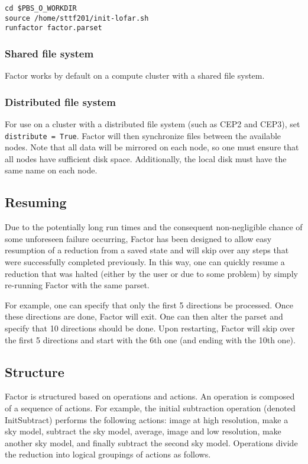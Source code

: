 \documentclass[structabstract]{article}
\begin{document}
{\begin{verbatim}
cd $PBS_O_WORKDIR
source /home/sttf201/init-lofar.sh
runfactor factor.parset
\end{verbatim}

\subsubsection{Shared file system}
Factor works by default on a compute cluster with a shared file system.

\subsubsection{Distributed file system}
For use on a cluster with a distributed file system (such as CEP2 and CEP3), set
{\tt distribute = True}. Factor will then synchronize files between the
available nodes. Note that all data will be mirrored on each node, so one must
ensure that all nodes have sufficient disk space. Additionally, the local disk
must have the same name on each node.


\subsection{Resuming}
\label{factor:resuming}

Due to the potentially long run times and the consequent non-negligible chance
of some unforeseen failure occurring, Factor has been designed to allow easy
resumption of a reduction from a saved state and will skip over any steps that
were successfully completed previously. In this way, one can quickly resume a
reduction that was halted (either by the user or due to some problem) by simply
re-running Factor with the same parset.

For example, one can specify that only the first 5 directions be processed.
Once these directions are done, Factor will exit. One can then alter the parset
and specify that 10 directions should be done. Upon restarting, Factor will skip
over the first 5 directions and start with the 6th one (and ending with the 10th
one).


\subsection{Structure}
\label{factor:structure}

Factor is structured based on operations and actions. An operation is composed
of a sequence of actions. For example, the initial subtraction operation
(denoted InitSubtract) performs the following actions: image at high resolution,
make a sky model, subtract the sky model, average, image and low resolution,
make another sky model, and finally subtract the second sky model. Operations
divide the reduction into logical groupings of actions as follows.

}
\end{document}
